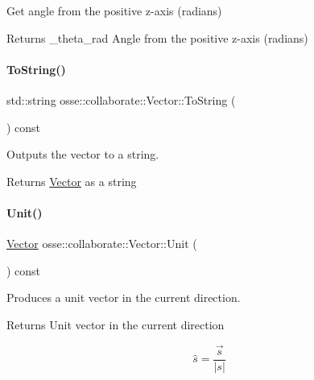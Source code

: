 Get angle from the positive z-\/axis (radians) 

\begin{DoxyReturn}{Returns}
\+\_\+theta\+\_\+rad Angle from the positive z-\/axis (radians) 
\end{DoxyReturn}
\mbox{\label{classosse_1_1collaborate_1_1_vector_af5fb0bf89a48d682cfbfda512b5fb24d}} 
\paragraph{\texorpdfstring{To\+String()}{ToString()}}
{\footnotesize\ttfamily std\+::string osse\+::collaborate\+::\+Vector\+::\+To\+String (\begin{DoxyParamCaption}{ }\end{DoxyParamCaption}) const}



Outputs the vector to a string. 

\begin{DoxyReturn}{Returns}
\hyperlink{classosse_1_1collaborate_1_1_vector}{Vector} as a string 
\end{DoxyReturn}
\mbox{\label{classosse_1_1collaborate_1_1_vector_a1067b0871f08bdca0c1021b3763adc80}} 
\paragraph{\texorpdfstring{Unit()}{Unit()}}
{\footnotesize\ttfamily \hyperlink{classosse_1_1collaborate_1_1_vector}{Vector} osse\+::collaborate\+::\+Vector\+::\+Unit (\begin{DoxyParamCaption}{ }\end{DoxyParamCaption}) const}



Produces a unit vector in the current direction. 

\begin{DoxyReturn}{Returns}
Unit vector in the current direction
\end{DoxyReturn}
\[ \hat{s} = \frac{\vec{s}}{\lvert s\rvert} \] \mbox{\label{classosse_1_1collaborate_1_1_vector_a27f502b21a0315ed49c9930e62594315}} 
